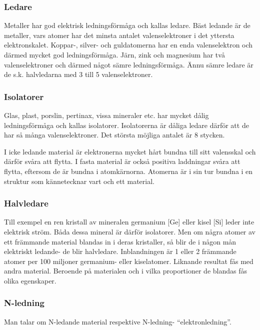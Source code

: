 \subsubsection{Ledare}

Metaller har god elektrisk ledningsförmåga och kallas ledare. Bäst ledande är
de metaller, vars atomer har det minsta antalet valenselektroner i det yttersta
elektronskalet. Koppar-, silver- och guldatomerna har en enda valenselektron
och därmed mycket god ledningsförmåga. Järn, zink och magnesium har två
valenselektroner och därmed något sämre ledningsförmåga. Ännu sämre ledare
är de s.k. halvledarna med 3 till 5 valenselektroner.

\subsubsection{Isolatorer}

Glas, plast, porslin, pertinax, vissa mineraler etc. har mycket dålig
ledningsförmåga och kallas isolatorer. Isolatorerna är dåliga ledare därför att
de har så många valenselektroner. Det största möjliga antalet är 8 stycken.

I icke ledande material är elektronerna mycket hårt bundna till sitt valensskal
och därför svåra att flytta. I fasta material är också positiva laddningar
svåra att flytta, eftersom de är bundna i atomkärnorna. Atomerna är i sin tur
bundna i en struktur som kännetecknar vart och ett material.

\subsubsection{Halvledare}

Till exempel en ren kristall av mineralen germanium [Ge] eller kisel [Si] leder
inte elektrisk ström. Båda dessa mineral är därför isolatorer. Men om några
atomer av ett främmande material blandas in i deras kristaller, så blir de i
någon mån elektriskt ledande- de blir halvledare. Inblandningen är 1 eller 2
främmande atomer per 100 miljoner germanium- eller kiselatomer. Liknande
resultat fås med andra material. Beroende på materialen och i vilka
proportioner de blandas fås olika egenskaper.

\subsubsection{N-ledning}
Man talar om N-ledande material respektive N-ledning- ``elektronledning''.

